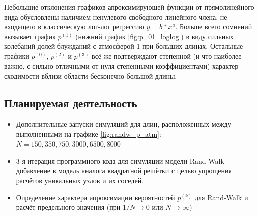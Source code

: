 Небольшие отклонения графиков апроксимирующей функции от прямолинейного вида обусловлены наличием ненулевого свободного линейного члена,
не входящего в классическую лог-лог регрессию $y = b * x^a$.
Больше всего сомнений вызывает график $p^{(1)}$ (нижний график \ref{fig:p_01_loglog}) в виду сильных колебаний долей блужданий с атмосферой 1 при больших длинах.
Остальные графики $p^{(0)}$, $p^{(2)}$ и $p^{(3)}$ всё же подтверждают степенной (и что наиболее важно, с сильно отличными от нуля степенными коэффициентами) характер сходимости вблизи области бесконечно большой длины.



\subsection{Планируемая деятельность}

\begin{itemize}
\item Дополнительные запуски симуляций для длин, расположенных между выполненными на графике \ref{fig:randw_p_atm}: $N=150, 350, 750, 3000, 6500, 8000$
\item 3-я итерация программного кода для симуляции модели Rand-Walk - добавление в модель аналога квадратной решётки с целью упрощения расчётов уникальных узлов и их соседей.
\item  Определение характера апроксимации вероятностей $p^{(k)}$ для Rand-Walk и расчёт предельного значения (при $1/N \to 0$ или $N \to \infty$)
\end{itemize}

